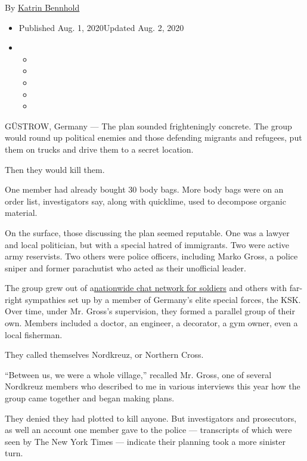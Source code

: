 By \href{https://www.nytimes.com/by/katrin-bennhold}{Katrin Bennhold}

\begin{itemize}
\item
  Published Aug. 1, 2020Updated Aug. 2, 2020
\item
  \begin{itemize}
  \item
  \item
  \item
  \item
  \item
  \end{itemize}
\end{itemize}

GÜSTROW, Germany --- The plan sounded frighteningly concrete. The group
would round up political enemies and those defending migrants and
refugees, put them on trucks and drive them to a secret location.

Then they would kill them.

One member had already bought 30 body bags. More body bags were on an
order list, investigators say, along with quicklime, used to decompose
organic material.

On the surface, those discussing the plan seemed reputable. One was a
lawyer and local politician, but with a special hatred of immigrants.
Two were active army reservists. Two others were police officers,
including Marko Gross, a police sniper and former parachutist who acted
as their unofficial leader.

The group grew out of
a\href{https://www.nytimes.com/2020/07/03/world/europe/germany-military-neo-nazis-ksk.html?searchResultPosition=2}{nationwide
chat network for soldiers} and others with far-right sympathies set up
by a member of Germany's elite special forces, the KSK. Over time, under
Mr. Gross's supervision, they formed a parallel group of their own.
Members included a doctor, an engineer, a decorator, a gym owner, even a
local fisherman.

They called themselves Nordkreuz, or Northern Cross.

``Between us, we were a whole village,'' recalled Mr. Gross, one of
several Nordkreuz members who described to me in various interviews this
year how the group came together and began making plans.

They denied they had plotted to kill anyone. But investigators and
prosecutors, as well an account one member gave to the police ---
transcripts of which were seen by The New York Times --- indicate their
planning took a more sinister turn.

